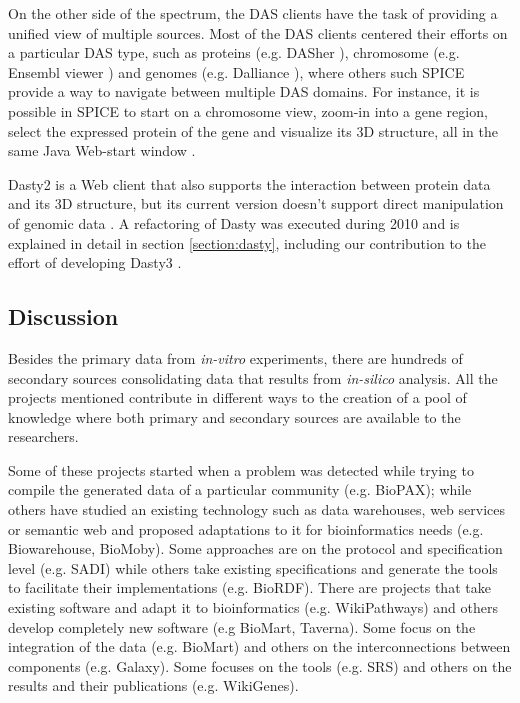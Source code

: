 On the other side of the spectrum, the DAS clients have the task of providing a unified view of multiple sources. Most of the DAS clients centered their efforts on a particular DAS type, such as proteins (e.g. DASher \cite{MES2009}), chromosome (e.g. Ensembl viewer \cite{FLI2011}) and genomes (e.g. Dalliance \cite{DOW2011}), where others such SPICE provide a way to navigate between multiple DAS domains. For instance, it is possible in SPICE to start on a chromosome view, zoom-in into a gene region, select the expressed protein of the gene and visualize its 3D structure, all in the same Java Web-start window \cite{PRL2005}.

Dasty2 is a Web client that also supports the interaction between protein data and its 3D structure, but its current version doesn't support direct manipulation of genomic data \cite{JIM2008}. A refactoring of Dasty was executed during 2010 and is explained in detail in section \ref{section:dasty}, including our contribution to the effort of developing Dasty3 \cite{VIL2011}. 

\subsection{Discussion}
Besides the primary data from \emph{in-vitro} experiments, there are hundreds of secondary sources consolidating data that results from \emph{in-silico} analysis. All the projects mentioned contribute in different ways to the creation of a pool of knowledge where both primary and secondary sources are available to the researchers.

Some of these projects started when a problem was detected while trying to compile the generated data of a particular community (e.g. BioPAX); while others have studied an existing technology such as data warehouses, web services or semantic web and proposed adaptations to it for bioinformatics needs (e.g. Biowarehouse, BioMoby). Some approaches are on the protocol and specification level (e.g. SADI) while others take existing specifications and generate the tools to facilitate their implementations (e.g. BioRDF). There are projects that take existing software and adapt it to bioinformatics (e.g. WikiPathways) and others develop completely new software (e.g BioMart, Taverna). Some focus on the integration of the data (e.g. BioMart) and others on the interconnections between components (e.g. Galaxy). Some focuses on the tools (e.g. SRS) and others on the results and their publications (e.g. WikiGenes). 

